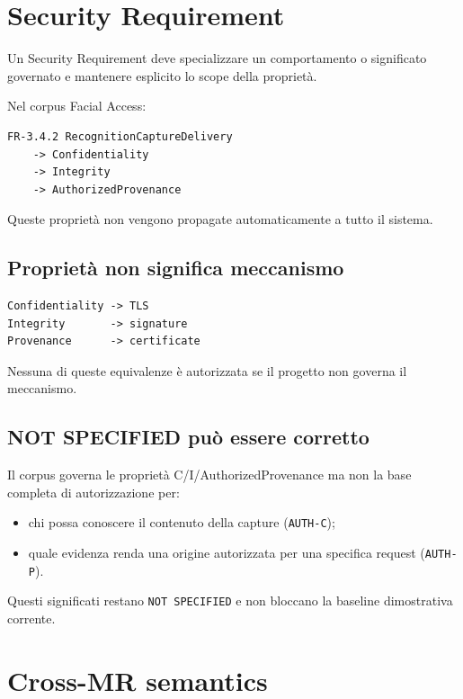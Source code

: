 \documentclass[11pt,a4paper]{article}
\newcommand{\code}[1]{\nolinkurl{#1}}
\begin{document}
\section{Security Requirement}

Un Security Requirement deve specializzare un comportamento o significato governato e mantenere esplicito lo scope della proprietà.

Nel corpus Facial Access:

\begin{lstlisting}
FR-3.4.2 RecognitionCaptureDelivery
    -> Confidentiality
    -> Integrity
    -> AuthorizedProvenance
\end{lstlisting}

Queste proprietà non vengono propagate automaticamente a tutto il sistema.

\subsection{Proprietà non significa meccanismo}

\begin{badbox}
\begin{lstlisting}
Confidentiality -> TLS
Integrity       -> signature
Provenance      -> certificate
\end{lstlisting}
Nessuna di queste equivalenze è autorizzata se il progetto non governa il meccanismo.
\end{badbox}

\subsection{NOT SPECIFIED può essere corretto}

Il corpus governa le proprietà C/I/AuthorizedProvenance ma non la base completa di autorizzazione per:

\begin{itemize}
\item chi possa conoscere il contenuto della capture (\code{AUTH-C});
\item quale evidenza renda una origine autorizzata per una specifica request (\code{AUTH-P}).
\end{itemize}

Questi significati restano \code{NOT SPECIFIED} e non bloccano la baseline dimostrativa corrente.

\section{Cross-MR semantics}
\end{document}
